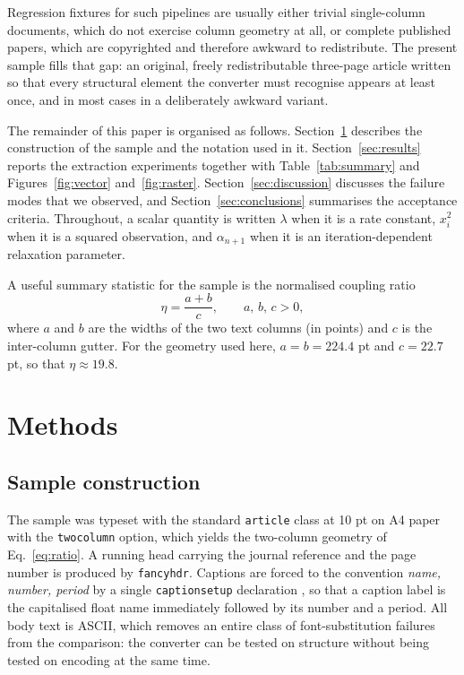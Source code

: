 \documentclass[10pt,twocolumn,a4paper]{article}
\begin{document}
Regression fixtures for such pipelines are usually either trivial
single-column documents, which do not exercise column geometry at all, or
complete published papers, which are copyrighted and therefore awkward to
redistribute. The present sample fills that gap: an original, freely
redistributable three-page article written so that every structural element
the converter must recognise appears at least once, and in most cases in a
deliberately awkward variant.

The remainder of this paper is organised as follows.
Section~\ref{sec:methods} describes the construction of the sample and the
notation used in it. Section~\ref{sec:results} reports the extraction
experiments together with Table~\ref{tab:summary} and
Figures~\ref{fig:vector} and~\ref{fig:raster}.
Section~\ref{sec:discussion} discusses the failure modes that we observed,
and Section~\ref{sec:conclusions} summarises the acceptance criteria.
Throughout, a scalar quantity is written $\lambda$ when it is a rate
constant, $x_i^{2}$ when it is a squared observation, and
$\alpha_{n+1}$ when it is an iteration-dependent relaxation parameter.

A useful summary statistic for the sample is the normalised coupling ratio
\begin{equation}
\label{eq:ratio}
\eta = \frac{a + b}{c}, \qquad a,\,b,\,c > 0 ,
\end{equation}
where $a$ and $b$ are the widths of the two text columns (in points) and $c$
is the inter-column gutter. For the geometry used here, $a = b = 224.4$ pt
and $c = 22.7$ pt, so that $\eta \approx 19.8$.

\section{Methods}
\label{sec:methods}

\subsection{Sample construction}

The sample was typeset with the standard \texttt{article} class at 10 pt on
A4 paper with the \texttt{twocolumn} option, which yields the two-column
geometry of Eq.~\eqref{eq:ratio}. A running head carrying the journal
reference and the page number is produced by \texttt{fancyhdr}. Captions are
forced to the convention \emph{name, number, period} by a single
\texttt{captionsetup} declaration \cite{ref3}, so that a caption label is the
capitalised float name immediately followed by its number and a period.
All body text is ASCII, which removes an entire class of font-substitution
failures from the comparison: the converter can be tested on structure
without being tested on encoding at the same time.
\end{document}
